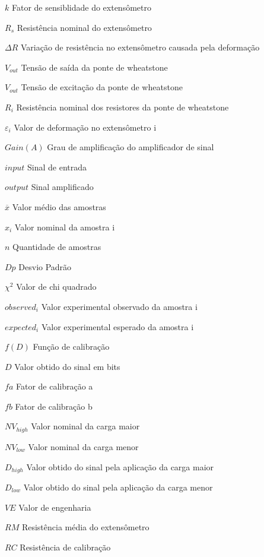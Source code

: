 \begin{simbolos}
    \item[$ k $] {Fator de sensiblidade do extensômetro}
    \item[$ R_s $] {Resistência nominal do extensômetro}
    \item[$ \Delta R $] {Variação de resistência no extensômetro causada pela deformação}

    \item[$ V_{out} $] {Tensão de saída da ponte de wheatstone}
    \item[$ V_{out} $] {Tensão de excitação da ponte de wheatstone}
    \item[$ R_i $] {Resistência nominal dos resistores da ponte de wheatstone}

    \item[$ \varepsilon_{i} $] {Valor de deformação no extensômetro i}

    \item[$ Gain(A) $] {Grau de amplificação do amplificador de sinal}
    \item[$ input $] {Sinal de entrada}
    \item[$ output $] {Sinal amplificado}

    \item[$ \overline{x} $] {Valor médio das amostras}
    \item[$ x_i $] {Valor nominal da amostra i}
    \item[$ n $] {Quantidade de amostras}

    \item[$ Dp $] {Desvio Padrão}

    \item[$ \chi^{2} $] {Valor de chi quadrado}
    \item[$ observed_i $] {Valor experimental observado da amostra i}
    \item[$ expected_i $] {Valor experimental esperado da amostra i}

    \item[$ f(D) $] {Função de calibração}
    \item[$ D $] {Valor obtido do sinal em bits}
    \item[$ fa $] {Fator de calibração a}
    \item[$ fb $] {Fator de calibração b}

    \item[$ NV_{high} $] {Valor nominal da carga maior}
    \item[$ NV_{low} $] {Valor nominal da carga menor}
    \item[$ D_{high} $] {Valor obtido do sinal pela aplicação da carga maior}
    \item[$ D_{low} $] {Valor obtido do sinal pela aplicação da carga menor}

    \item[$ VE $] {Valor de engenharia}
    \item[$ RM $] {Resistência média do extensômetro}
    \item[$ RC $] {Resistência de calibração}

\end{simbolos}

